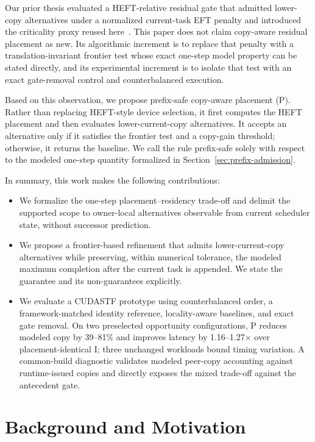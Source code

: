 \documentclass[sigconf]{acmart}
\providecommand{\tightlist}{\setlength{\itemsep}{0pt}\setlength{\parskip}{0pt}}
\begin{document}
Our prior thesis evaluated a HEFT-relative residual gate that admitted lower-copy alternatives under a normalized current-task EFT penalty and introduced the criticality proxy reused here~\citep{chengli2026multiobjective}. This paper does not claim copy-aware residual placement as new. Its algorithmic increment is to replace that penalty with a translation-invariant frontier test whose exact one-step model property can be stated directly, and its experimental increment is to isolate that test with an exact gate-removal control and counterbalanced execution.

Based on this observation, we propose prefix-safe copy-aware placement (P). Rather than replacing HEFT-style device selection, it first computes the HEFT placement and then evaluates lower-current-copy alternatives. It accepts an alternative only if it satisfies the frontier test and a copy-gain threshold; otherwise, it returns the baseline. We call the rule prefix-safe solely with respect to the modeled one-step quantity formalized in Section~\ref{sec:prefix-admission}.

In summary, this work makes the following contributions:
\begin{itemize}
\tightlist
\item
  We formalize the one-step placement--residency trade-off and delimit the supported scope to owner-local alternatives observable from current scheduler state, without successor prediction.
\item
  We propose a frontier-based refinement that admits lower-current-copy alternatives while preserving, within numerical tolerance, the modeled maximum completion after the current task is appended. We state the guarantee and its non-guarantees explicitly.
\item
  We evaluate a CUDASTF prototype using counterbalanced order, a framework-matched identity reference, locality-aware baselines, and exact gate removal. On two preselected opportunity configurations, P reduces modeled copy by 39--81\% and improves latency by 1.16--1.27\(\times\) over placement-identical I; three unchanged workloads bound timing variation. A common-build diagnostic validates modeled peer-copy accounting against runtime-issued copies and directly exposes the mixed trade-off against the antecedent gate.
\end{itemize}

\section{Background and Motivation}\label{sec:background}
\end{document}
